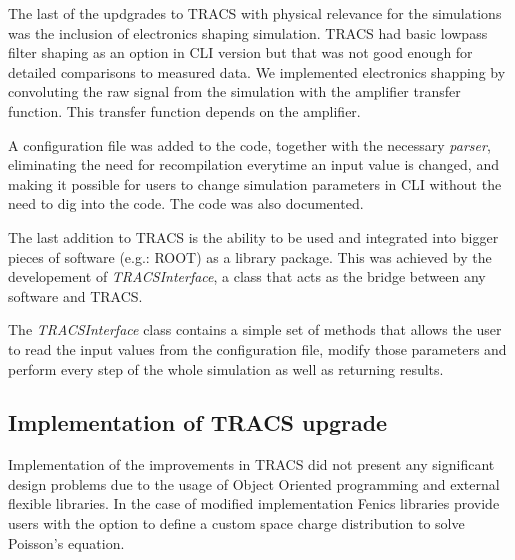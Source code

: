 The last of the updgrades to TRACS with physical relevance for the simulations was the inclusion of electronics shaping simulation. TRACS had basic lowpass filter shaping as an option in CLI version but that was not good enough for detailed comparisons to measured data. We implemented electronics shapping by convoluting the raw signal from the simulation with the amplifier transfer function. This transfer function depends  on the amplifier.



A configuration file was added to the code, together with the necessary \textit{parser}, eliminating the need for recompilation everytime an input value is changed, and making it possible for users to change simulation parameters in CLI without the need to dig into the code. The code was also documented.

The last addition to TRACS is the ability to be used and integrated into bigger pieces of software (e.g.: ROOT) as a library package. This was achieved by the developement of \textit{TRACSInterface}, a class that acts as the bridge between any software and TRACS.

The \textit{TRACSInterface} class contains a simple set of methods that allows the user to read the input values from the configuration file, modify those parameters and perform every step of the whole simulation as well as returning results.

\subsection{Implementation of TRACS upgrade}

Implementation of the improvements in TRACS did not present any significant design problems due to the usage of Object Oriented programming and external flexible libraries. In the case of modified \neff implementation Fenics libraries provide users with the option to define a custom space charge distribution to solve Poisson's equation. 


